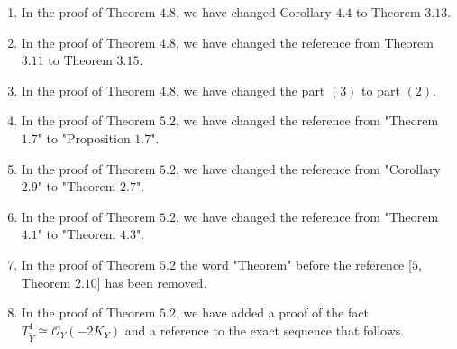 \documentclass[11pt,twoside]{amsart}
\theoremstyle{plain}
\numberwithin{equation}{section}
\theoremstyle{definition}
\begin{document}
\begin{enumerate}
\item[$(39)$] In the proof of Theorem $4.8$, we have changed Corollary $4.4$ to Theorem $3.13$.

\item[$(40)$] In the proof of Theorem $4.8$, we have changed the reference from Theorem $3.11$ to Theorem $3.15$. 

\item[$(41)$] In the proof of Theorem $4.8$, we have changed the part $(3)$ to part $(2)$.

\item[$(42)$] In the proof of Theorem $5.2$, we have changed the reference from "Theorem $1.7$" to "Proposition $1.7$".

\item[$(43)$] In the proof of Theorem $5.2$, we have changed the reference from "Corollary $2.9$" to "Theorem $2.7$".

\item[$(44)$] In the proof of Theorem $5.2$, we have changed the reference from "Theorem $4.1$" to "Theorem $4.3$".

\item[$(45)$] In the proof of Theorem $5.2$ the word "Theorem" before the reference [$5$, Theorem $2.10$] has been removed.

\item[$(46)$] In the proof of Theorem $5.2$, we have added a proof of the fact $T_{\widetilde{Y}}^1 \cong \mathcal{O}_Y(-2K_Y)$ and a reference to the exact sequence that follows.

    
\end{enumerate}
\end{document}

